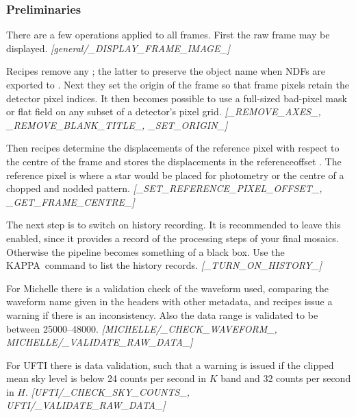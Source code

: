 \documentclass[twoside,11pt,nolof]{starlink}
\providecommand{\KAPPA}{{\footnotesize KAPPA}}
\providecommand{\FITSref}{\htmladdnormallink{FITS}{http://fits.gsfc.nasa.gov/}}
\begin{document}
\subsubsection{Preliminaries\label{preliminaries}}

There are a few operations applied to all frames.  First the raw frame
may be displayed.  \newline \emph{[general/\_DISPLAY\_FRAME\_IMAGE\_]}

Recipes remove any ;
the latter to preserve the object name when NDFs are exported to
\FITSref.  Next they set the origin of the frame so that frame pixels retain the detector
pixel indices.  It then becomes possible to use a full-sized bad-pixel
mask or flat field on any subset of a detector's pixel grid.
\newline \emph{[\_REMOVE\_AXES\_, \_REMOVE\_BLANK\_TITLE\_, \_SET\_ORIGIN\_]}

Then recipes determine the displacements of the reference pixel with
respect to the centre of the frame and stores the displacements in the
referenceoffset .
The reference pixel is where a star would be placed for photometry or
the centre of a chopped and nodded pattern.
\newline \emph{[\_SET\_REFERENCE\_PIXEL\_OFFSET\_, \_GET\_FRAME\_CENTRE\_]}

The next step is to switch on history recording.  It is recommended to
leave this enabled, since it provides a record of the processing steps
of your final mosaics.  Otherwise the pipeline becomes something of
a black box.  Use the \KAPPA\ command
 to list the history records.
\newline \emph{[\_TURN\_ON\_HISTORY\_]}

For Michelle there is a validation check of the waveform used,
comparing the waveform name given in the headers with other metadata,
and recipes issue a warning if there is an inconsistency.  Also the
data range is validated to be between 25000--48000.
\newline \emph{[MICHELLE/\_CHECK\_WAVEFORM\_, MICHELLE/\_VALIDATE\_RAW\_DATA\_]}

For UFTI there is data validation, such that a warning is issued if the
clipped mean sky level is below 24 counts per second in $K$ band and 32 counts
per second in $H$.
\newline \emph{[UFTI/\_CHECK\_SKY\_COUNTS\_, UFTI/\_VALIDATE\_RAW\_DATA\_]}
\end{document}
